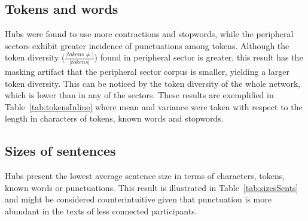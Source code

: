 \subsection{Tokens and words}\label{subsec:tw}
%

Hubs were found to use more contractions and stopwords, while the peripheral sectors exhibit greater incidence of punctuations among tokens.
Although the token diversity ($\frac{|tokens \neq|}{|tokens|}$) found in peripheral sector is greater,
this result has the masking artifact that the peripheral sector corpus is smaller, yielding a larger token diversity.
This can be noticed by the token diversity of the whole network, which is lower than in any of the sectors.
These results are exemplified in Table~\ref{tab:tokensInline}
where mean and variance were taken with respect to the length in characters of tokens, known words and stopwords.

\FloatBarrier



%

\subsection{Sizes of sentences}\label{subsec:ss}
Hubs present the lowest average sentence size
in terms of characters, tokens, known words or punctuations.
This result is illustrated in Table~\ref{tab:sizesSents}
and might be considered counterintuitive given that punctuation
is more abundant in the texts of less connected participants.

\FloatBarrier

